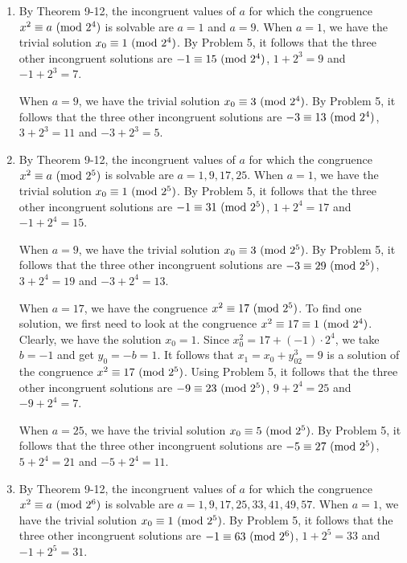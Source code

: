\begin{solution}
    \begin{enumerate}
        \item By Theorem 9-12, the incongruent values of $a$ for which the congruence $x^2 \equiv a \ (\mathrm{mod}\ 2^4)$ is solvable are $a = 1$ and $a = 9$. When $a = 1$, we have the trivial solution $x_0 \equiv 1 \ (\mathrm{mod}\ 2^4)$. By Problem 5, it follows that the three other incongruent solutions are $-1 \equiv 15 \ (\mathrm{mod}\ 2^4)$, $1 + 2^3 = 9$ and $-1 + 2^3 = 7$.
        
        When $a = 9$, we have the trivial solution $x_0 \equiv 3 \ (\mathrm{mod}\ 2^4)$. By Problem 5, it follows that the three other incongruent solutions are $-3 \equiv 13 \ (\mathrm{mod}\ 2^4)$, $3 + 2^3 = 11$ and $-3 + 2^3 = 5$.
        \item By Theorem 9-12, the incongruent values of $a$ for which the congruence $x^2 \equiv a \ (\mathrm{mod}\ 2^5)$ is solvable are $a = 1, 9, 17, 25$. When $a = 1$, we have the trivial solution $x_0 \equiv 1 \ (\mathrm{mod}\ 2^5)$. By Problem 5, it follows that the three other incongruent solutions are $-1 \equiv 31 \ (\mathrm{mod}\ 2^5)$, $1 + 2^4 = 17$ and $-1 + 2^4 = 15$.
        
        When $a = 9$, we have the trivial solution $x_0 \equiv 3 \ (\mathrm{mod}\ 2^5)$. By Problem 5, it follows that the three other incongruent solutions are $-3 \equiv 29 \ (\mathrm{mod}\ 2^5)$, $3 + 2^4 = 19$ and $-3 + 2^4 = 13$.

        When $a = 17$, we have the congruence $x^2 \equiv 17 \ (\mathrm{mod}\ 2^5)$. To find one solution, we first need to look at the congruence $x^2 \equiv 17 \equiv 1 \ (\mathrm{mod}\ 2^4)$. Clearly, we have the solution $x_0 = 1$. Since $x_0^2 = 17 + (-1)\cdot 2^4$, we take $b = -1$ and get $y_0 = -b = 1$. It follows that $x_1 = x_0 + y_02^3 = 9$ is a solution of the congruence $x^2 \equiv 17 \ (\mathrm{mod}\ 2^5)$. Using Problem 5, it follows that the three other incongruent solutions are $-9 \equiv 23 \ (\mathrm{mod}\ 2^5)$, $9 + 2^4 = 25$ and $-9 + 2^4 = 7$.

        When $a = 25$, we have the trivial solution $x_0 \equiv 5 \ (\mathrm{mod}\ 2^5)$. By Problem 5, it follows that the three other incongruent solutions are $-5 \equiv 27 \ (\mathrm{mod}\ 2^5)$, $5 + 2^4 = 21$ and $-5 + 2^4 = 11$.
        \item By Theorem 9-12, the incongruent values of $a$ for which the congruence $x^2 \equiv a \ (\mathrm{mod}\ 2^6)$ is solvable are $a = 1, 9, 17, 25, 33, 41, 49, 57$. When $a = 1$, we have the trivial solution $x_0 \equiv 1 \ (\mathrm{mod}\ 2^5)$. By Problem 5, it follows that the three other incongruent solutions are $-1 \equiv 63 \ (\mathrm{mod}\ 2^6)$, $1 + 2^5 = 33$ and $-1 + 2^5 = 31$.
        

\end{enumerate}
\end{solution}
